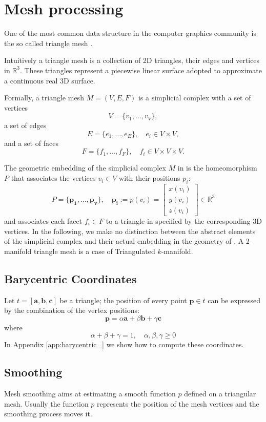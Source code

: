 \section{Mesh processing}
One of the most common data structure in the computer graphics community is the so called triangle mesh \cite{botsch2010polygon}.

Intuitively a triangle mesh is a collection of 2D triangles, their edges and vertices in $\mathbb{R}^3$. 
These triangles represent a piecewise linear surface adopted to approximate a continuous real 3D surface. 

Formally, a triangle mesh $\mathit{M} = (V,E,F)$ is a simplicial complex with a set of vertices
\[
  \mathit{V} = \{v_1, \dots, v_V\},
\]
a set of edges
\[
  \mathit{E} = \{e_1, \dots, e_E\}, \quad e_i \in \mathit{V}\times\mathit{V},
\]
and a set of faces
\[
  \mathit{F} = \{f_1, \dots, f_F\},\quad f_i \in \mathit{V}\times\mathit{V}\times\mathit{V}.
\]

The geometric embedding of the simplicial complex $\mathit{M}$ in \Rthree  is the homeomorphism $\mathit{P}$ that associates the vertices $v_i \in \mathit{V}$ with their positions $p_i$:
\[
\mathit{P} = \{\mathbf{p_1}, \dots, \mathbf{p_v}\}, \quad \mathbf{p_i}:=p(v_i) = 
\begin{bmatrix}
x(v_i)\\
y(v_i)\\
z(v_i)
\end{bmatrix}
\in \mathbb{R}^3
\]
and associates each facet $f_i\in \mathit{F}$ to a triangle in \Rthree specified by the corresponding  3D vertices.
In the following, we make no distinction between the abstract elements of the simplicial complex and their actual embedding in the geometry of \Rthree.
A 2-manifold triangle mesh is a case of Triangulated $k$-manifold.

\subsection{Barycentric Coordinates}
Let $\mathit{t} = [\mathbf{a}, \mathbf{b}, \mathbf{c}]$ be a triangle; the position of every point $\mathbf{p} \in \mathit{t}$  can be expressed by the combination of the vertex positions:
\[
\mathbf{p} = \alpha \mathbf{a} + \beta \mathbf{b} + \gamma \mathbf{c}
\]
where 
\[
\alpha + \beta + \gamma = 1, \quad \alpha, \beta, \gamma \geq 0
\]
In Appendix \ref{app:barycentric_} we show how to compute these coordinates. 

\subsection{Smoothing}
Mesh smoothing aims at estimating a smooth function $p$ defined on a triangular mesh.
Usually the function $p$ represents the position of the mesh vertices and the smoothing process moves it. 

